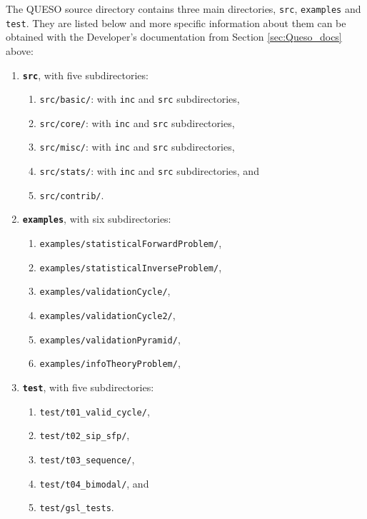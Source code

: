 The QUESO source directory contains three main directories, \texttt{src}, \texttt{examples} and \texttt{test}. They are listed below and more specific
information about them can be obtained with the Developer's documentation from Section \ref{sec:Queso_docs} above:
\begin{enumerate}
\item \texttt{\bf src}, with five subdirectories:
\begin{enumerate}
\item \texttt{src/basic/}: with \texttt{inc} and \texttt{src} subdirectories,
\item \texttt{src/core/}:  with \texttt{inc} and \texttt{src} subdirectories,
\item \texttt{src/misc/}:  with \texttt{inc} and \texttt{src} subdirectories,
\item \texttt{src/stats/}: with \texttt{inc} and \texttt{src} subdirectories, and
\item \texttt{src/contrib/}.
\end{enumerate}

\item \texttt{\bf examples}, with six subdirectories:
\begin{enumerate}
\item \texttt{examples/statisticalForwardProblem/},
\item \texttt{examples/statisticalInverseProblem/},
\item \texttt{examples/validationCycle/}, 
\item \texttt{examples/validationCycle2/},
\item \texttt{examples/validationPyramid/},
\item \texttt{examples/infoTheoryProblem/},
\end{enumerate}

\item  \texttt{\bf test}, with five subdirectories:
\begin{enumerate}
\item \texttt{test/t01\_valid\_cycle/},
\item \texttt{test/t02\_sip\_sfp/},
\item \texttt{test/t03\_sequence/}, 
\item \texttt{test/t04\_bimodal/}, and
\item \texttt{test/gsl\_tests}.
\end{enumerate}

\end{enumerate}


